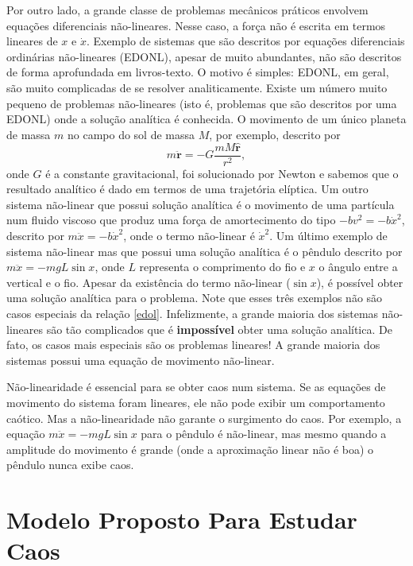 \documentclass{article}
\begin{document}
Por outro lado, a grande classe de problemas mecânicos práticos envolvem equações diferenciais não-lineares. Nesse caso, a força não é escrita em termos lineares de $x$ e $\dot{x}$. Exemplo de sistemas que são descritos por equações diferenciais ordinárias não-lineares (EDONL), apesar de muito abundantes, não são descritos de forma aprofundada em livros-texto. O motivo é simples: EDONL, em geral, são muito complicadas de se resolver analiticamente. Existe um número muito pequeno de problemas não-lineares (isto é, problemas que são descritos por uma EDONL) onde a solução analítica é conhecida. O movimento de um único planeta de massa $m$ no campo do sol de massa $M$, por exemplo, descrito por
\begin{equation}
    m\mathbf{\ddot{r}} = -G\frac{mM\mathbf{\hat{r}}}{r^2},
\end{equation}
onde  $G$ é a constante gravitacional, foi solucionado por Newton e sabemos que o resultado analítico é dado em termos de uma trajetória elíptica. Um outro sistema não-linear que possui solução analítica é o movimento de uma partícula num fluido viscoso que produz uma força de amortecimento do tipo $-bv^2 = -b\dot{x}^2$, descrito por $m\ddot{x} = -b\dot{x}^2$, onde o termo não-linear é $\dot{x}^2$. Um último exemplo de sistema não-linear mas que possui uma solução analítica é o pêndulo descrito por $m\ddot{x} = -mgL\sin x$, onde $L$ representa o comprimento do fio e $x$ o ângulo entre a vertical e o fio. Apesar da existência do termo não-linear ($\sin x$), é possível obter uma solução analítica para o problema. Note que esses três exemplos não são casos especiais da relação \eqref{edol}. Infelizmente, a grande maioria dos sistemas não-lineares são tão complicados que é \textbf{impossível} obter uma solução analítica. De fato, os casos mais especiais são os problemas lineares! A grande maioria dos sistemas possui uma equação de movimento não-linear.

Não-linearidade é essencial para se obter caos num sistema. Se as equações de movimento do sistema foram lineares, ele não pode exibir um comportamento caótico. Mas a não-linearidade não garante o surgimento do caos. Por exemplo, a equação $m\ddot{x} = -mgL\sin x$ para o pêndulo é não-linear, mas mesmo quando a amplitude do movimento é grande (onde a aproximação linear não é boa) o pêndulo nunca exibe caos.

\section{Modelo Proposto Para Estudar Caos}
\end{document}
